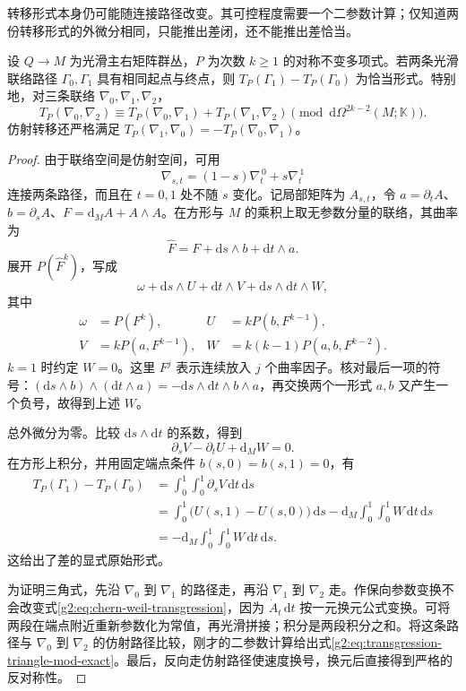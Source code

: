 \ProseParagraphBreak

转移形式本身仍可能随连接路径改变。其可控程度需要一个二参数计算；仅知道两份转移形式的外微分相同，只能推出差闭，还不能推出差恰当。

\begin{proposition}\label{g2:prop:transgression-path-homotopy}
	设 \(Q\to M\) 为光滑主右矩阵群丛，\(P\) 为次数 \(k\ge1\) 的对称不变多项式。若两条光滑联络路径 \(\Gamma_0,\Gamma_1\) 具有相同起点与终点，则 \(T_P(\Gamma_1)-T_P(\Gamma_0)\) 为恰当形式。特别地，对三条联络 \(\nabla_0,\nabla_1,\nabla_2\)，
	\begin{equation}\label{g2:eq:transgression-triangle-mod-exact}
		T_P(\nabla_0,\nabla_2)
		\equiv T_P(\nabla_0,\nabla_1)+T_P(\nabla_1,\nabla_2)
		\pmod{\mathrm d\Omega^{2k-2}(M;\mathbb K)}.
	\end{equation}
	仿射转移还严格满足 \(T_P(\nabla_1,\nabla_0)=-T_P(\nabla_0,\nabla_1)\)。
\end{proposition}
\begin{proof}
	由于联络空间是仿射空间，可用
	\[
		\nabla_{s,t}=(1-s)\nabla_t^{\,0}+s\nabla_t^{\,1}
	\]
	连接两条路径，而且在 \(t=0,1\) 处不随 \(s\) 变化。记局部矩阵为 \(A_{s,t}\)，令 \(a=\partial_tA\)、\(b=\partial_sA\)、\(F=\mathrm d_MA+A\wedge A\)。在方形与 \(M\) 的乘积上取无参数分量的联络，其曲率为
	\[
		\widehat F=F+\mathrm ds\wedge b+\mathrm dt\wedge a.
	\]
	展开 \(P(\widehat F^k)\)，写成
	\[
		\omega+\mathrm ds\wedge U+\mathrm dt\wedge V
		+\mathrm ds\wedge\mathrm dt\wedge W,
	\]
	其中
	\[
	\begin{aligned}
		\omega&=P(F^k),&
		U&=kP(b,F^{k-1}),\\
		V&=kP(a,F^{k-1}),&
		W&=k(k-1)P(a,b,F^{k-2}).
	\end{aligned}
	\]
	\(k=1\) 时约定 \(W=0\)。这里 \(F^j\) 表示连续放入 \(j\) 个曲率因子。核对最后一项的符号：\((\mathrm ds\wedge b)\wedge(\mathrm dt\wedge a)=-\mathrm ds\wedge\mathrm dt\wedge b\wedge a\)，再交换两个一形式 \(a,b\) 又产生一个负号，故得到上述 \(W\)。

	总外微分为零。比较 \(\mathrm ds\wedge\mathrm dt\) 的系数，得到
	\[
		\partial_sV-\partial_tU+\mathrm d_MW=0.
	\]
	在方形上积分，并用固定端点条件 \(b(s,0)=b(s,1)=0\)，有
	\[
	\begin{aligned}
		T_P(\Gamma_1)-T_P(\Gamma_0)
		&=\int_0^1\int_0^1\partial_sV\,\mathrm dt\,\mathrm ds\\
		&=\int_0^1\bigl(U(s,1)-U(s,0)\bigr)\,\mathrm ds
		-\mathrm d_M\int_0^1\int_0^1W\,\mathrm dt\,\mathrm ds\\
		&=-\mathrm d_M\int_0^1\int_0^1W\,\mathrm dt\,\mathrm ds.
	\end{aligned}
	\]
	这给出了差的显式原始形式。

	为证明三角式，先沿 \(\nabla_0\) 到 \(\nabla_1\) 的路径走，再沿 \(\nabla_1\) 到 \(\nabla_2\) 走。作保向参数变换不会改变式\eqref{g2:eq:chern-weil-transgression}，因为 \(\dot A_t\,\mathrm dt\) 按一元换元公式变换。可将两段在端点附近重新参数化为常值，再光滑拼接；积分是两段积分之和。将这条路径与 \(\nabla_0\) 到 \(\nabla_2\) 的仿射路径比较，刚才的二参数计算给出式\eqref{g2:eq:transgression-triangle-mod-exact}。最后，反向走仿射路径使速度换号，换元后直接得到严格的反对称性。
\end{proof}

